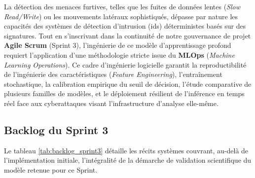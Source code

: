 La détection des menaces furtives, telles que les fuites de données lentes (\textit{Slow Read/Write}) ou les mouvements latéraux sophistiqués, dépasse par nature les capacités des systèmes de détection d'intrusion (\acrshort{ids}) déterministes basés sur des signatures. Tout en s'inscrivant dans la continuité de notre gouvernance de projet \textbf{Agile Scrum} (Sprint 3), l'ingénierie de ce modèle d'apprentissage profond requiert l'application d'une méthodologie stricte issue du \textbf{MLOps} (\textit{Machine Learning Operations}). Ce cadre d'ingénierie logicielle garantit la reproductibilité de l'ingénierie des caractéristiques (\textit{Feature Engineering}), l'entraînement stochastique, la calibration empirique du seuil de décision, l'étude comparative de plusieurs familles de modèles, et le déploiement résilient de l'inférence en temps réel face aux cyberattaques visant l'infrastructure d'analyse elle-même.

\subsection{Backlog du Sprint 3}
Le tableau \ref{tab:backlog_sprint3} détaille les récits systèmes couvrant, au-delà de l'implémentation initiale, l'intégralité de la démarche de validation scientifique du modèle retenue pour ce Sprint.

